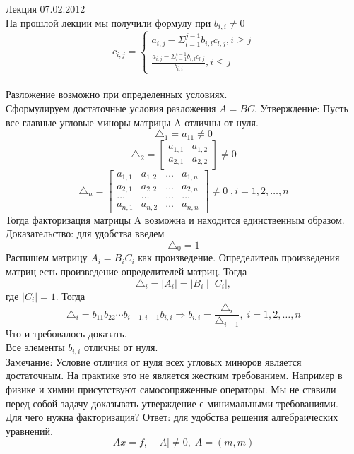 \documentclass[oneside, final, 14pt]{extreport}
\begin{document}
Лекция 07.02.2012
\\
На прошлой лекции мы получили формулу при \( b_{i,i} \neq 0 \)
\[ c_{i,j} = \begin{cases} a_{i,j}-\Sigma_{l=1}^{j-1}b_{i,l}c_{l,j},  i \geq j \\
\frac{a_{i,j}-\Sigma_{l=1}^{i-1}b_{i,l}c_{l,j}}{b_{i,i}},  i \leq j \end{cases}  \] 
\\			
Разложение возможно при определенных условиях.
\\
Сформулируем достаточные условия разложения \begin{math}A=BC\end{math}.
Утверждение: Пусть все главные угловые миноры матрицы A отличны от нуля.
\[ \triangle_1 = a_{11} \neq 0 \]
\[ \triangle_2 = \begin{bmatrix} a_{1,1} & a_{1,2} \\ a_{2,1} & a_{2,2} \end{bmatrix} \neq 0 \]
\[ \triangle_n = \begin{bmatrix}a_{1,1} & a_{1,2} & \ldots & a_{1,n} \\ a_{2,1} & a_{2,2} & \ldots & a_{2,n} \\ \ldots & \ldots  & \ldots & \ldots  \\ a_{n,1} & a_{n,2} & \ldots &a_{n,n}   \end{bmatrix}\neq 0 \; , i=1, 2, \ldots, n \] 
Тогда факторизация матрицы A возможна и находится единственным образом.
Доказательство: для удобства введем \[ \triangle_0 = 1 \]
Распишем матрицу \( A_i=B_iC_i \) как произведение. Определитель произведения матриц есть произведение определителей матриц. Тогда 
\[ \triangle_i = \mid A_i \mid = \mid B_i \mid \mid C_i \mid, \]  где \( \mid C_i \mid =1\). 
Тогда 
\[ \triangle_i=b_{11}b_{22} \cdots b_{i-1,i-1}b_{i,i} \Rightarrow b_{i,i} = \frac{\triangle_i}{\triangle_{i-1}}, \; i=1,2, \ldots, n\]
Что и требовалось доказать.
\\
Все элементы \(b_{i,i}\) отличны от нуля. 
\\
Замечание: Условие отличия от нуля всех угловых миноров является достаточным. На практике это не является жестким требованием. Например в физике и химии присутствуют самосопряженные операторы. Мы не ставили перед собой задачу доказывать утверждение с минимальными требованиями. 
\\
Для чего нужна факторизация? Ответ: для удобства решения алгебраических уравнений. 
\begin{equation} Ax=f, \; \mid A \mid \neq 0, \; A=(m,m)\end{equation} 
\end{document}
